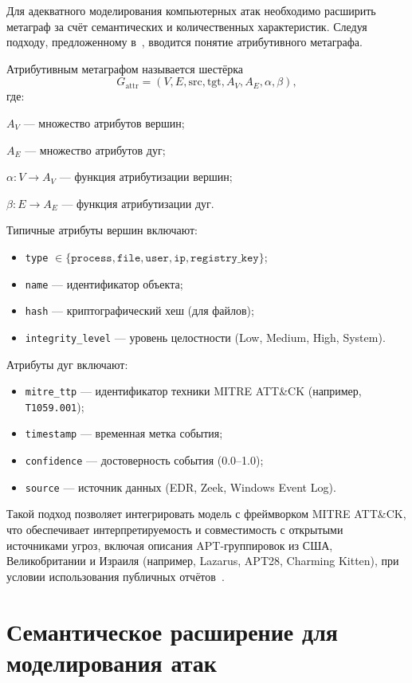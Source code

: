 Для адекватного моделирования компьютерных атак необходимо расширить метаграф за счёт семантических и количественных характеристик. Следуя подходу, предложенному в~\cite{Latypov2020}, вводится понятие атрибутивного метаграфа.

\begin{definition}
Атрибутивным метаграфом называется шестёрка
\[
G_{\mathrm{attr}} = (V, E, \mathrm{src}, \mathrm{tgt}, A_V, A_E, \alpha, \beta),
\]
где:
    \item $A_V$ — множество атрибутов вершин;
    \item $A_E$ — множество атрибутов дуг;
    \item $\alpha: V \rightarrow A_V$ — функция атрибутизации вершин;
    \item $\beta: E \rightarrow A_E$ — функция атрибутизации дуг.
\end{definition}

Типичные атрибуты вершин включают:
\begin{itemize}
    \item \texttt{type} $\in \{\texttt{process}, \texttt{file}, \texttt{user}, \texttt{ip}, \texttt{registry\_key}\}$;
    \item \texttt{name} — идентификатор объекта;
    \item \texttt{hash} — криптографический хеш (для файлов);
    \item \texttt{integrity\_level} — уровень целостности (Low, Medium, High, System).
\end{itemize}
Атрибуты дуг включают:
\begin{itemize}
    \item \texttt{mitre\_ttp} — идентификатор техники MITRE ATT\&CK (например, \texttt{T1059.001});
    \item \texttt{timestamp} — временная метка события;
    \item \texttt{confidence} — достоверность события (0.0–1.0);
    \item \texttt{source} — источник данных (EDR, Zeek, Windows Event Log).
\end{itemize}

Такой подход позволяет интегрировать модель с фреймворком MITRE ATT\&CK, что обеспечивает интерпретируемость и совместимость с открытыми источниками угроз, включая описания APT-группировок из США, Великобритании и Израиля (например, Lazarus, APT28, Charming Kitten), при условии использования публичных отчётов~\cite{Mandiant2023,CrowdStrike2024}.

\section{Семантическое расширение для моделирования атак}

